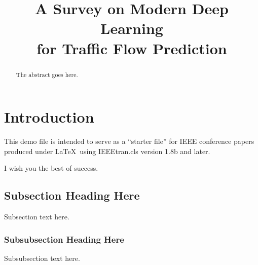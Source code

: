 \documentclass[conference]{IEEEtran}
\begin{document}
\title{A Survey on Modern Deep Learning\\ for Traffic Flow Prediction}

\author{
}

\maketitle

\begin{abstract}
The abstract goes here.
\end{abstract}


%
\IEEEpeerreviewmaketitle

\section{Introduction}

This demo file is intended to serve as a ``starter file''
for IEEE conference papers produced under \LaTeX\ using
IEEEtran.cls version 1.8b and later.\cite{jiang_graph_2022}

I wish you the best of success.\cite{vlahogianni_short-term_2014}

\subsection{Subsection Heading Here}
Subsection text here.\cite{zhu_big_2019}

\subsubsection{Subsubsection Heading Here}
Subsubsection text here.
\end{document}
